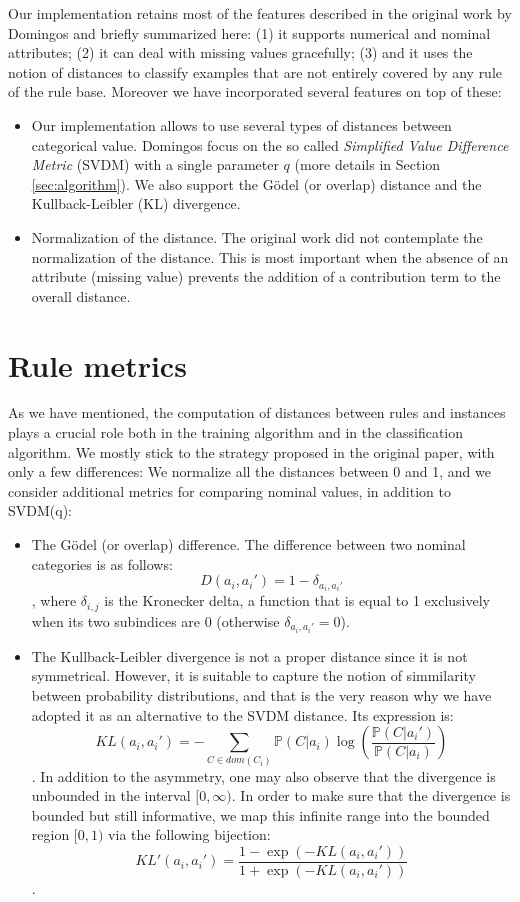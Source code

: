 \documentclass[a4paper]{article}
\begin{document}
Our implementation retains most of the features described in the original work by Domingos and briefly summarized here: (1) it supports numerical and nominal attributes; (2) it can deal with missing values gracefully; (3) and it uses the notion of distances to classify examples that are not entirely covered by any rule of the rule base. Moreover we have incorporated several features on top of these:
\begin{itemize}
	\item Our implementation allows to use several types of distances between categorical value. Domingos focus on the so called \emph{Simplified Value Difference Metric} (SVDM) with a single parameter $ q $ (more details in Section \ref{sec:algorithm}). We also support the G\"odel (or overlap) distance and the Kullback-Leibler (KL) divergence.
    \item Normalization of the distance. The original work did not contemplate the normalization of the distance. This is most important when the absence of an attribute (missing value) prevents the addition of a contribution term to the overall distance.
\end{itemize}

\section{Rule metrics}
\label{sec:distance}

As we have mentioned, the computation of distances between rules and instances plays a crucial role both in the training algorithm and in the classification algorithm. We mostly stick to the strategy proposed in the original paper, with only a few differences: We normalize all the distances between 0 and 1, and we consider additional metrics for comparing nominal values, in addition to SVDM(q):
\begin{itemize}
	\item The G\"odel (or overlap) difference. The difference between two nominal categories is as follows:
	\[D(a_i, a_i') = 1 - \delta_{a_i, a_i'} \],
	where $ \delta_{i,j} $ is the Kronecker delta, a function that is equal to 1 exclusively when its two subindices are 0 (otherwise $ \delta_{a_i, a_i'} = 0 $).
	\item The Kullback-Leibler divergence is not a proper distance since it is not symmetrical. However, it is suitable to capture the notion of simmilarity between probability distributions, and that is the very reason why we have adopted it as an alternative to the SVDM distance. Its expression is:
	\[ KL(a_i, a_i') = -\sum_{C \in dom(C_i)} \mathbb{P}(C|a_i) \log \left( \frac{\mathbb{P}(C|a_i')}{\mathbb{P}(C|a_i)} \right) \].
	In addition to the asymmetry, one may also observe that the divergence is unbounded in the interval $ [0, \infty) $. In order to make sure that the divergence is bounded but still informative, we map this infinite range into the bounded region $ [0, 1) $ via the following bijection:
	\[ KL'(a_i, a_i') = \frac{1 - \exp(-KL(a_i, a_i'))}{1 + \exp(-KL(a_i, a_i'))} \].
\end{itemize}
\end{document}
